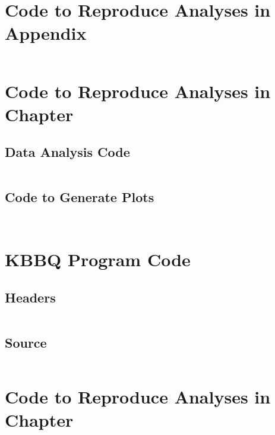 
\chapter{Code to Reproduce Analyses in Appendix \protect\structuredref{}}
\label{ch:structured_code}
\newpage
\inputminted[breaklines, breakanywhere, tabsize=2]{Makefile}{ch3/scripts/ch3_makefiles.txt}

\chapter{Code to Reproduce Analyses in Chapter \protect\kbbqref{}}
\label{ch:kbbq_plot_code}
\newpage
\section{Data Analysis Code}
\inputminted[breaklines, breakanywhere, tabsize=2]{Makefile}{ch4/scripts/ch4_makefiles.txt}
\section{Code to Generate Plots}
\inputminted[breaklines, breakanywhere, tabsize=2]{r}{ch4/scripts/plot_benchmarks.R}
\inputminted[breaklines, breakanywhere, tabsize=2]{r}{defense/recalibration_explainer.R}

\chapter{KBBQ Program Code}
\label{ch:kbbq_code}
\newpage
\section{Headers}
\inputminted[breaklines, breakanywhere, tabsize=2]{cpp}{ch4/scripts/kbbq_include.hh}
\section{Source}
\inputminted[breaklines, breakanywhere, tabsize=2]{cpp}{ch4/scripts/kbbq_src.cc}

\chapter{Code to Reproduce Analyses in Chapter \protect\evaluatingref{}}
\label{ch:evaluating_code}
\newpage
